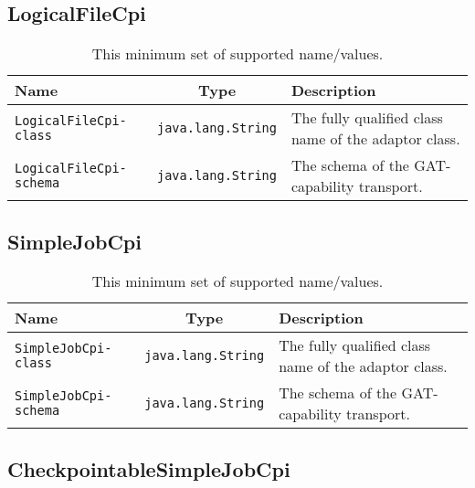 \documentclass[$Date: 2003/06/26 19:29:31 $]{glabarticle}
\begin{document}
\newpage

\subsection{LogicalFileCpi}

\begin{table}[htp]
\begin{center}
\begin{tabular}{|l|c|l|} \hline
Name & Type & Description \\ \hline\hline
\verb"LogicalFileCpi-class" & \verb"java.lang.String" & The fully qualified class name of the adaptor class. \\ \hline
\verb"LogicalFileCpi-schema" & \verb"java.lang.String" & The schema of the GAT-capability transport. \\ \hline
\end{tabular}
\end{center}
\caption{This minimum set of supported name/values.}
\label{table:SRD}
\end{table}

\newpage

\subsection{SimpleJobCpi}

\begin{table}[htp]
\begin{center}
\begin{tabular}{|l|c|l|} \hline
Name & Type & Description \\ \hline\hline
\verb"SimpleJobCpi-class" & \verb"java.lang.String" & The fully qualified class name of the adaptor class. \\ \hline
\verb"SimpleJobCpi-schema" & \verb"java.lang.String" & The schema of the GAT-capability transport. \\ \hline
\end{tabular}
\end{center}
\caption{This minimum set of supported name/values.}
\label{table:SRD}
\end{table}

\newpage

\subsection{CheckpointableSimpleJobCpi}
\end{document}
